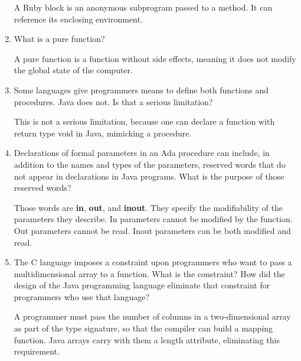 \begin{enumerate}
  \begin{answer}
    A Ruby block is an anonymous subprogram passed to a method. It can reference
    its enclosing environment.
    \end{answer}

  \item What is a pure function?

  \begin{answer}
    A pure function is a function without side effects, meaning it does not modify
    the global state of the computer.
    \end{answer}

  \item Some languages give programmers means to define
    both functions and procedures. Java does not. Is that
    a serious limitation?

  \begin{answer}
    This is not a serious limitation, because one can declare a function with return
    type void in Java, mimicking a procedure.
    \end{answer}

  \item Declarations of formal parameters in an Ada procedure
    can include, in addition to the names and types of the
    parameters, reserved words that do not appear in declarations
    in Java programs. 
    What is the purpose of those reserved words?

  \begin{answer}
    Those words are \textbf{in}, \textbf{out}, and \textbf{inout}. They specify the 
    modifiability of the parameters they describe. In parameters cannot be modified 
    by the function. Out parameters cannot be read. Inout parameters can be both 
    modified and read.
    \end{answer}
 
  \item The C language imposes a constraint upon programmers
    who want to pass a multidimensional array to a function.
    What is the constraint? How did the design of the Java
    programming language eliminate that constraint for 
    programmers who use that language?

  \begin{answer}
    A programmer must pass the number of columns in a two-dimensional array as part 
    of the type signature, so that the compiler can build a mapping function. Java 
    arrays carry with them a length attribute, eliminating this requirement.
    \end{answer}


\end{enumerate}

